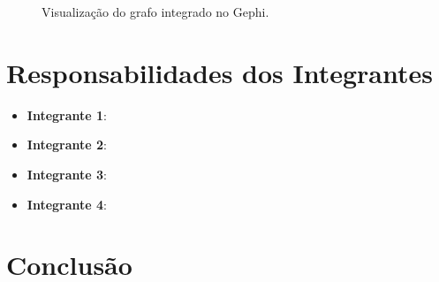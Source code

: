 \documentclass[a4paper,11pt]{article}
\begin{document}

\begin{figure}[h]
  \centering
  \caption{Visualização do grafo integrado no Gephi.}
  \label{fig:gephi}
\end{figure}

\section{Responsabilidades dos Integrantes}\label{sec:responsabilidades}

\begin{itemize}
  \item \textbf{Integrante 1}: %
  \item \textbf{Integrante 2}: %
  \item \textbf{Integrante 3}: %
  \item \textbf{Integrante 4}: %
\end{itemize}

\section{Conclusão}\label{sec:conclusao}

\end{document}
